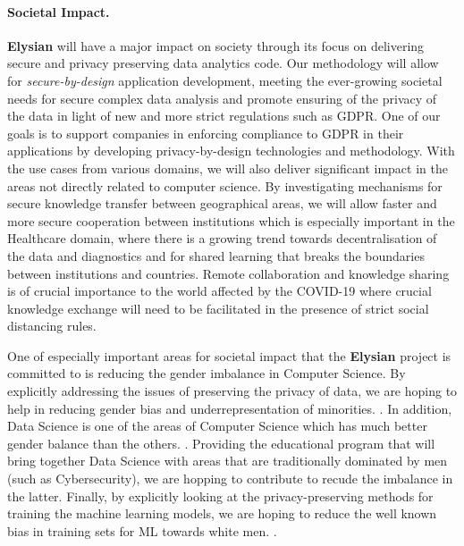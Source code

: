 \documentclass[a4paper,11pt]{article}
\newcommand{\project}[1]{\textbf{#1}\xspace}
\newcommand{\SECURITY}{\project{Elysian}}
\newcommand{\TheProject}{\SECURITY}
\begin{document}
\paragraph*{Societal Impact.}
\noindent
\TheProject{} will have a major impact on society through its focus on delivering secure and privacy preserving data analytics code. Our methodology will allow for \emph{secure-by-design} application development, meeting the ever-growing societal needs for secure complex data analysis and promote ensuring of the privacy of the data in light of new and more strict regulations such as GDPR. One of our goals is to support companies in enforcing compliance to GDPR in their applications by developing privacy-by-design technologies and methodology. With the use cases from various domains, we will also deliver significant impact in the areas not directly related to computer science. By investigating mechanisms for secure knowledge transfer between geographical areas, we will allow faster and more secure cooperation between institutions which is especially important in the Healthcare domain, where there is a growing trend towards decentralisation of the data and diagnostics and for shared learning that breaks the boundaries between institutions and countries. Remote collaboration and knowledge sharing is of crucial importance to the world affected by the COVID-19 where crucial knowledge exchange will need to be facilitated in the presence of strict social distancing rules.

\begin{mdframed}[backgroundcolor=blue!5]
One of especially important areas for societal impact that the \TheProject{} project is committed to is reducing the gender imbalance in Computer Science. By explicitly addressing the issues of preserving the privacy of data, we are hoping to help in reducing gender bias and underrepresentation of minorities. . In addition, Data Science is one of the areas of Computer Science which has much better gender balance than the others. . Providing the educational program that will bring together Data Science with areas that are traditionally dominated by men (such as Cybersecurity), we are hopping to contribute to recude the imbalance in the latter. Finally, by explicitly looking at the privacy-preserving methods for training the machine learning models, we are hoping to reduce the well known bias in training sets for ML towards white men. . 
\end{mdframed}
 
\end{document}
